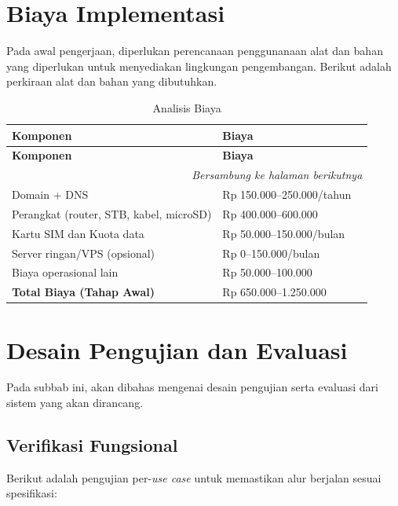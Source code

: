 \section{Biaya Implementasi}
Pada awal pengerjaan, diperlukan perencanaan penggunanaan alat dan bahan yang diperlukan untuk menyediakan lingkungan pengembangan. Berikut adalah perkiraan alat dan bahan yang dibutuhkan.

\begin{longtable}{|p{7cm}|p{5cm}|p{5cm}|}
\caption{Analisis Biaya}
\label{tbl:Biaya} \\
\hline
\textbf{Komponen} &  \textbf{Biaya} \\
\hline
\endfirsthead

\hline
\textbf{Komponen} &  \textbf{Biaya} \\
\hline
\endhead

\hline
\multicolumn{3}{r}{\textit{Bersambung ke halaman berikutnya}} \\
\endfoot

\hline
\endlastfoot

Domain + DNS
&
Rp 150.000--250.000/tahun
\\ \hline

Perangkat (router, STB, kabel, microSD)
&
Rp 400.000--600.000
\\ \hline

Kartu SIM dan Kuota data
&
Rp 50.000--150.000/bulan
\\ \hline

Server ringan/VPS (opsional)
&
Rp 0--150.000/bulan
\\ \hline

Biaya operasional lain
&
Rp 50.000--100.000
\\ \hline

\textbf{Total Biaya (Tahap Awal)}
&
Rp 650.000--1.250.000
\\ \hline
\end{longtable}

\section{Desain Pengujian dan Evaluasi}

Pada subbab ini, akan dibahas mengenai desain pengujian serta evaluasi dari sistem yang akan dirancang.

\subsection{Verifikasi Fungsional}
Berikut adalah pengujian per-\textit{use case} untuk memastikan alur berjalan sesuai spesifikasi:


